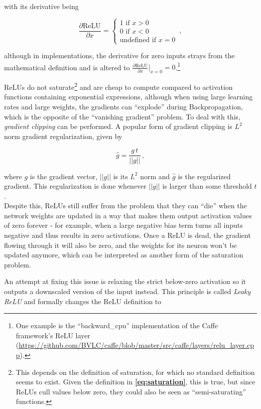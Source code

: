 \noindent with its derivative being 

\[ \frac{\partial \text{ReLU}}{\partial x} = \begin{cases}
							1 \text { if } x > 0\\
							0 \text { if } x < 0\\
							 \text{undefined if } x = 0
						        \end{cases} \,,
\]

\noindent although in implementations, the derivative for zero inputs strays from the mathematical definition and is altered to $\frac{\partial \text{ReLU}}{\partial x}\rvert_{x=0} = 0$.\footnote{One example is the ``backward\_cpu'' implementation of the Caffe framework's ReLU layer (\url{https://github.com/BVLC/caffe/blob/master/src/caffe/layers/relu_layer.cpp}).}

ReLUs do not saturate\footnote{This depends on the definition of saturation, for which no standard definition seems to exist. Given the definition in \textbf{\ref{eq:saturation}}, this is true, but since ReLUs cull values below zero, they could also be seen as ``semi-saturating'' functions.} and are cheap to compute compared to activation functions containing exponential expressions, although when using large learning rates and large weights, the gradients can ``explode'' during Backpropagation, which is the opposite of the ``vanishing gradient'' problem. To deal with this, \textit{gradient clipping} can be performed. A popular form of gradient clipping is $L^2$ norm gradient regularization, given by

\[ \hat{g} = \frac{g\,t}{||g||} \,, \]

\noindent where $g$ is the gradient vector, $||g||$ is its $L^2$ norm and $\hat{g}$ is the regularized gradient. This regularization is done whenever $||g||$ is larger than some threshold $t$. \cite{l2clipping}\\

\noindent Despite this, ReLUs still suffer from the problem that they can ``die'' when the network weights are updated in a way that makes them output activation values of zero forever - for example, when a large negative bias term turns all inputs negative and thus results in zero activations. Once a ReLU is dead, the gradient flowing through it will also be zero, and the weights for its neuron won't be updated anymore, which can be interpreted as another form of the saturation problem.

An attempt at fixing this issue is relaxing the strict below-zero activation so it outputs a downscaled version of the input instead. This principle is called \textit{Leaky ReLU} \cite{lrelu} and formally changes the ReLU definition to 

